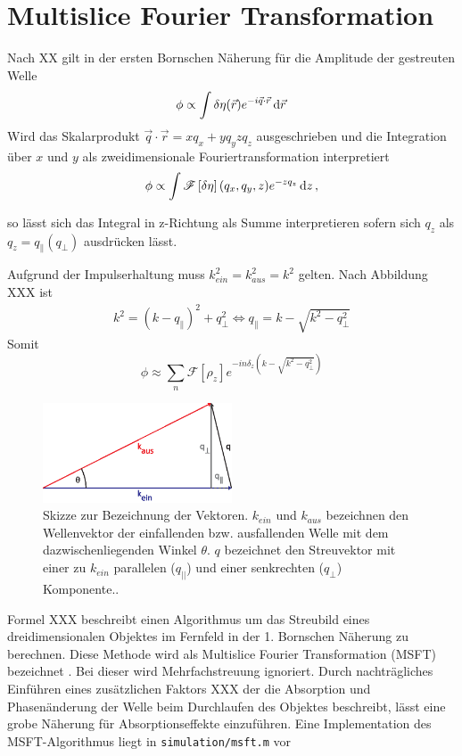 \section{Multislice Fourier Transformation}
	Nach XX gilt in der ersten Bornschen Näherung für die Amplitude der gestreuten Welle
	\begin{equation}
		\phi\propto\int \delta\eta(\vec{r}) e^{-i\vec{q}\cdot \vec{r}} \dif \vec{r}
	\end{equation}
    Wird das Skalarprodukt $\vec{q}\cdot \vec{r}=xq_x+yq_yzq_z$ ausgeschrieben und die Integration über $x$ und $y$ als zweidimensionale Fouriertransformation interpretiert
	\begin{equation}
	\phi\propto\int \mathscr{F}\left[\delta\eta\right](q_x,q_y,z) e^{-zq_z} \dif z \, ,
	\end{equation}

	so lässt sich das Integral in z-Richtung als Summe interpretieren sofern sich $q_z$ als $q_z=q_\parallel(q_\perp)$ ausdrücken lässt.
	
	Aufgrund der Impulserhaltung muss $k_{ein}^2=k_{aus}^2=k^2$ gelten. Nach Abbildung XXX ist
	\begin{align}
	k^2=(k-q_\parallel)^2+q_{\perp}^2
	\Leftrightarrow q_\parallel=k-\sqrt{k^2-q_\perp^2}
	\end{align}
	Somit
	\begin{equation}
	\phi\approx\sum_n{\mathscr{F}\left[\rho_z\right] e^{-in\delta_z\left(k-\sqrt{k^2-q_\perp^2}\right) }}
	\end{equation}

	\begin{figure}
		\centering
		\includegraphics[width=0.5\textwidth]{images/msft.eps}
		\caption[Vektoren bei MSFT]{Skizze zur Bezeichnung der Vektoren. $k_{ein}$ und $k_{aus}$ bezeichnen den Wellenvektor der einfallenden bzw. ausfallenden Welle mit dem dazwischenliegenden Winkel $\theta$. $q$ bezeichnet den Streuvektor mit einer zu $k_{ein}$ parallelen ($q_{||}$) und einer senkrechten ($q_\perp$) Komponente.. }
		\label{fig:msft}
	\end{figure} 

	Formel XXX beschreibt einen Algorithmus um das Streubild eines dreidimensionalen Objektes im Fernfeld in der 1. Bornschen Näherung zu berechnen. Diese Methode wird als Multislice Fourier Transformation (MSFT) bezeichnet \cite{barke2015}. Bei dieser wird Mehrfachstreuung ignoriert. Durch nachträgliches Einführen eines zusätzlichen Faktors XXX der die Absorption und Phasenänderung der Welle beim Durchlaufen des Objektes beschreibt, lässt eine grobe Näherung für Absorptionseffekte einzuführen. Eine Implementation des MSFT-Algorithmus liegt in \texttt{simulation/msft.m} vor 

